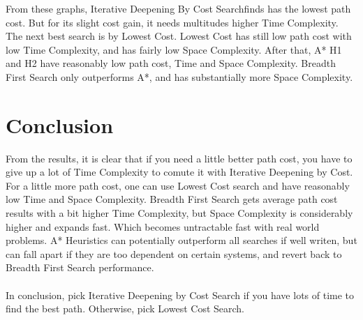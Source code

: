 \documentclass[12pt]{article}
\begin{document}
	From these graphs, Iterative Deepening By Cost Searchfinds has the lowest path cost. But for its slight cost gain, it needs multitudes higher Time Complexity. The next best search is by Lowest Cost. Lowest Cost has still low path cost with low Time Complexity, and has fairly low Space Complexity. After that, A* H1 and H2 have reasonably low path cost, Time and Space Complexity. Breadth First Search only outperforms A*, and has substantially more Space Complexity.


\section{Conclusion}
	From the results, it is clear that if you need a little better path cost, you have to give up a lot of Time Complexity to comute it with Iterative Deepening by Cost. For a little more path cost, one can use Lowest Cost search and have reasonably low Time and Space Complexity. Breadth First Search gets average path cost results with a bit higher Time Complexity, but Space Complexity is considerably higher and expands fast. Which becomes untractable fast with real world problems. A* Heuristics can potentially outperform all searches if well writen, but can fall apart if they are too dependent on certain systems, and revert back to Breadth First Search performance. 
	\\ \\
	In conclusion, pick Iterative Deepening by Cost Search if you have lots of time to find the best path. Otherwise, pick Lowest Cost Search.
\end{document}
